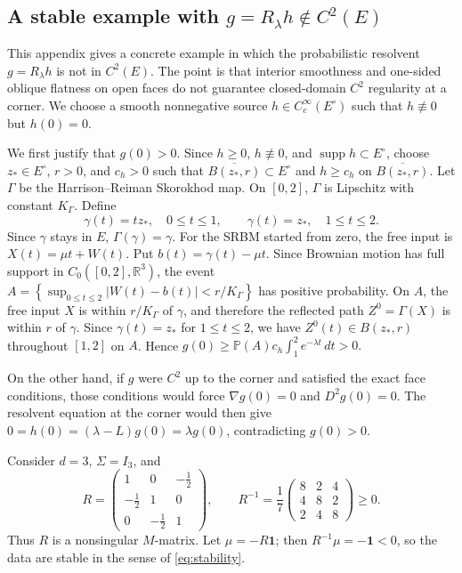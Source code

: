 \documentclass[aihp]{imsart}
\numberwithin{equation}{section}
\theoremstyle{plain}
\theoremstyle{definition}
\newcommand{\1}{\mathbf 1}
\begin{document}
\begin{appendix}



\section{A stable example with \texorpdfstring{$g=R_\lambda h\notin C^2(E)$}{g=Rlambda h not in C2(E)}}\label{app:resolvent-not-C2}

This appendix gives a concrete example in which the probabilistic resolvent \(g=R_\lambda h\) is not in \(C^2(E)\).  The point is that interior smoothness and one-sided oblique flatness on open faces do not guarantee closed-domain \(C^2\) regularity at a corner.  We choose a smooth nonnegative source \(h\in C_c^\infty(E^\circ)\) such that \(h\not\equiv0\) but \(h(0)=0\). 

We first justify that \(g(0)>0\). Since \(h\ge0\), \(h\not\equiv0\), and
\(\operatorname{supp}h\subset E^\circ\), choose \(z_\ast\in E^\circ\), \(r>0\), and
\(c_h>0\) such that \(\overline{B(z_\ast,r)}\subset E^\circ\) and
\(h\ge c_h\) on \(\overline{B(z_\ast,r)}\). Let \(\Gamma\) be the Harrison--Reiman
Skorokhod map. On \([0,2]\), \(\Gamma\) is Lipschitz with constant \(K_\Gamma\).
Define
\[
        \gamma(t)=tz_\ast,\quad 0\le t\le1,
        \qquad
        \gamma(t)=z_\ast,\quad 1\le t\le2.
\]
Since \(\gamma\) stays in \(E\), \(\Gamma(\gamma)=\gamma\). For the SRBM started from
zero, the free input is \(X(t)=\mu t+W(t)\). Put \(b(t)=\gamma(t)-\mu t\). Since
Brownian motion has full support in \(C_0([0,2],\mathbb R^3)\), the event $A=\left\{
        \sup_{0\le t\le2}|W(t)-b(t)|<r/K_\Gamma
        \right\}$ has positive probability. On \(A\), the free input \(X\) is within \(r/K_\Gamma\) of
\(\gamma\), and therefore the reflected path \(Z^0=\Gamma(X)\) is within \(r\) of
\(\gamma\). Since \(\gamma(t)=z_\ast\) for \(1\le t\le2\), we have
\(Z^0(t)\in B(z_\ast,r)\) throughout \([1,2]\) on \(A\). Hence $g(0)\ge
        \mathbb P(A)c_h\int_1^2 e^{-\lambda t}\,dt
        >
        0 .$


On the other hand, if \(g\) were \(C^2\) up to the corner and satisfied the exact face conditions, those conditions would force \(\nabla g(0)=0\) and \(D^2g(0)=0\).  The resolvent equation at the corner would then give \(0=h(0)=(\lambda-L)g(0)=\lambda g(0)\), contradicting \(g(0)>0\).

Consider $d=3$, $\Sigma=I_3$, and
\[
R=
\begin{pmatrix}
1&0&-\frac12\\
-\frac12&1&0\\
0&-\frac12&1
\end{pmatrix},
\qquad
R^{-1}=\frac17
\begin{pmatrix}
8&2&4\\
4&8&2\\
2&4&8
\end{pmatrix}\ge0 .
\]
Thus $R$ is a nonsingular $M$-matrix.  Let $\mu=-R\mathbf 1$; then $R^{-1}\mu=-\mathbf 1<0$, so the data are stable in the sense of \eqref{eq:stability}.


\end{appendix}
\end{document}
